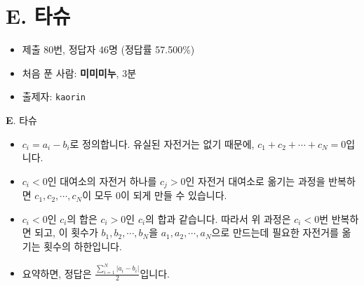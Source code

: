\section{E. 타슈}

\begin{frame} %
    \begin{itemize}
        \item 제출 80번, 정답자 46명 (정답률 57.500\%)
        \item 처음 푼 사람: \textbf{미미미누}, 3분
        \item 출제자: \texttt{kaorin}
    \end{itemize}
\end{frame}


\begin{frame}{\textbf{E}. 타슈}
    \begin{itemize}
        \item $c_i = a_i - b_i$로 정의합니다. 유실된 자전거는 없기 때문에, $c_1 + c_2 + \cdots + c_N = 0$입니다.
        \item $c_i < 0$인 대여소의 자전거 하나를 $c_j > 0$인 자전거 대여소로 옮기는 과정을 반복하면 $c_1, c_2, \cdots, c_N$이 모두 $0$이 되게 만들 수 있습니다.
        \item $c_i < 0$인 $c_i$의 합은 $c_i > 0$인 $c_i$의 합과 같습니다. 따라서 위 과정은 $c_i < 0$번 반복하면 되고, 이 횟수가 $b_1, b_2, \cdots, b_N$을 $a_1, a_2, \cdots, a_N$으로 만드는데 필요한 자전거를 옮기는 횟수의 하한입니다.
        \item 요약하면, 정답은 $\frac{\sum_{i=1}^{N}|a_i - b_i|}{2}$입니다.
    \end{itemize}

\end{frame}